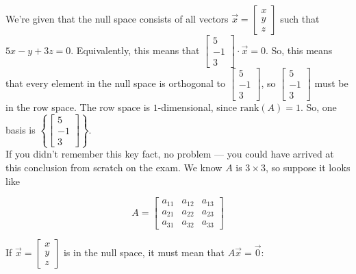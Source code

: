 \documentclass[11pt]{article}
\begin{document}
\begin{prob}[(16 pts)]
\begin{subprob}
\begin{solution}
We're given that the null space consists of all vectors $\vec x = \begin{bmatrix} x \\ y \\ z \end{bmatrix}$ such that $5x-y+3z = 0$. Equivalently, this means that $\begin{bmatrix} 5 \\ -1 \\ 3 \end{bmatrix} \cdot \vec x = 0$. So, this means that every element in the null space is orthogonal to $\begin{bmatrix} 5 \\ -1 \\ 3 \end{bmatrix}$, so $\begin{bmatrix} 5 \\ -1 \\ 3 \end{bmatrix}$ must be in the row space. The row space is $1$-dimensional, since $\text{rank}(A)=1$. So, one basis is $\left\{ \begin{bmatrix} 5 \\ -1 \\ 3 \end{bmatrix} \right\}$. \\

If you didn't remember this key fact, no problem --- you could have arrived at this conclusion from scratch on the exam. We know $A$ is $3 \times 3$, so suppose it looks like

$$A = \begin{bmatrix} a_{11} & a_{12} & a_{13} \\ a_{21} & a_{22} & a_{23} \\ a_{31} & a_{32} & a_{33} \end{bmatrix}$$

If $\vec x = \begin{bmatrix} x \\ y \\ z \end{bmatrix}$ is in the null space, it must mean that $A \vec x = \vec 0$:


\end{solution}
\end{subprob}
\end{prob}
\end{document}
